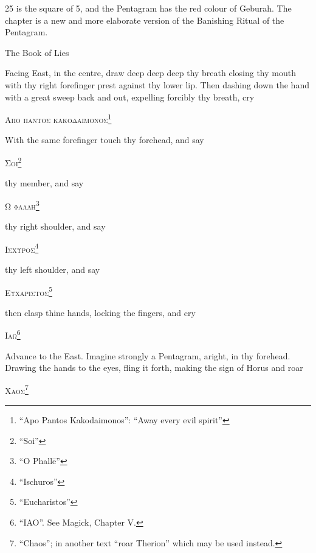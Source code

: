 
\epigraph{25 is the square of 5, and the Pentagram has the red colour of Geburah. The chapter is a new and more elaborate version of the Banishing Ritual of the Pentagram.}{The Book of Lies}


Facing East, in the centre, draw deep deep deep thy breath closing thy mouth with thy right forefinger prest against thy lower lip. Then dashing down the hand with a great sweep back and out, expelling forcibly thy breath, cry


\begin{quoting}[indentfirst=false]
\textsc{Απο παντος κακοδαιμονος}\footnote{\enquote{Apo Pantos Kakodaimonos}: \enquote{Away every evil spirit}}
\end{quoting}

With the same forefinger touch thy forehead, and say
\begin{quoting}[indentfirst=false]
\textsc{Σοι}\footnote{\enquote{Soi}}
\end{quoting}

thy member, and say
\begin{quoting}[indentfirst=false]
\textsc{Ω φαλλη}\footnote{\enquote{O Phall\=e}}
\end{quoting}

thy right shoulder, and say
\begin{quoting}[indentfirst=false]
\textsc{Ισχυροσ}\footnote{\enquote{Ischuros}}
\end{quoting}

thy left shoulder, and say
\begin{quoting}[indentfirst=false]
\textsc{Ευχαριστοσ}\footnote{\enquote{Eucharistos}}
\end{quoting}

then clasp thine hands, locking the fingers, and cry
\begin{quoting}[indentfirst=false]
\textsc{Ιαω}\footnote{\enquote{IAO}. See Magick, Chapter V.}
\end{quoting}

Advance to the East. Imagine strongly a Pentagram, aright, in thy forehead. Drawing the hands to the eyes, fling it forth, making the sign of Horus and roar
\begin{quoting}[indentfirst=false]
\textsc{Χαοσ}\footnote{\enquote{Chaos}; in another text \enquote{roar Therion} which may be used instead.}
\end{quoting}

